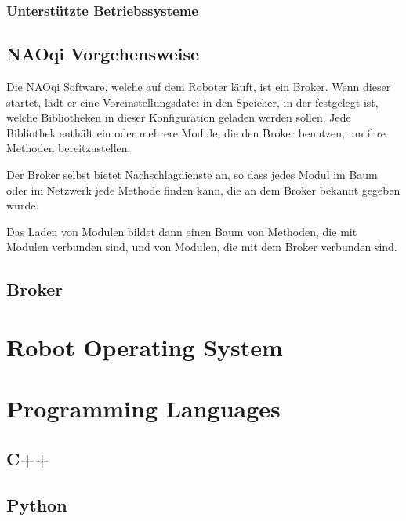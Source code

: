 \subsubsection{Unterstützte Betriebssysteme}
\label{subsubsec:UnterstützteBetriebssysteme}

\subsection{NAOqi Vorgehensweise}
\label{subsec:NAOqiVorgehensweise}
\par Die NAOqi Software, welche auf dem Roboter läuft, ist ein Broker. Wenn dieser startet, lädt er eine Voreinstellungsdatei in den Speicher, in der festgelegt ist, welche Bibliotheken in dieser Konfiguration geladen werden sollen. Jede Bibliothek enthält ein oder mehrere Module, die den Broker benutzen, um ihre Methoden bereitzustellen.
\par Der Broker selbst bietet Nachschlagdienste an, so dass jedes Modul im Baum oder im Netzwerk jede Methode finden kann, die an dem Broker bekannt gegeben wurde.
\par Das Laden von Modulen bildet dann einen Baum von Methoden, die mit Modulen verbunden sind, und von Modulen, die mit dem Broker verbunden sind.

\subsection{Broker}
\label{subsec:Broker}







\section{Robot Operating System}
\label{sec:ROS}

\section{Programming Languages}

\subsection{C++}
\label{subsec:Cpp}

\subsection{Python}
\label{subsec:Python}

